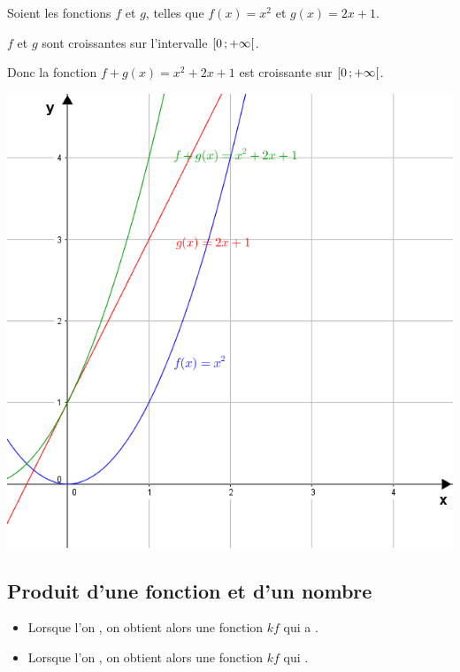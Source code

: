 \documentclass[12pt,a4paper]{article}
\begin{document}
	\begin{myex}
		\begin{multicols}{2}
			\vspace*{20mm}
			
			Soient les fonctions $f$ et $g$, telles que $f(x) = x^2$ et $g(x)=2x+1$.
			
			$f$ et $g$ sont croissantes sur l'intervalle $\mbox{\ensuremath{\left[0\mathpunct{};+\infty\right[}}$.
			
			Donc la fonction $f+g(x) = x^2 + 2x + 1$ est croissante sur $\mbox{\ensuremath{\left[0\mathpunct{};+\infty\right[}}$.
			
			\includegraphics[scale=0.6]{./img/f+g}
		\end{multicols}
	\end{myex}
	
	\subsection{Produit d'une fonction et d'un nombre}
	
	\begin{myprops}
		\begin{itemize}
			\item Lorsque l'on , on obtient alors une fonction $kf$ qui a .
			\item Lorsque l'on , on obtient alors une fonction $kf$ qui .
		\end{itemize}
	\end{myprops}
	
\end{document}
